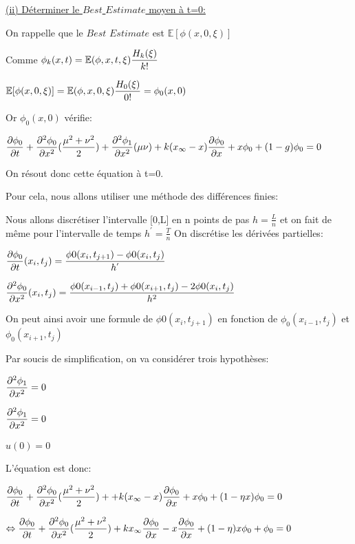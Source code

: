 \documentclass[a4paper,oneside,11pt]{article}
\newcommand{\ds}{\ensuremath{\displaystyle}}
\newcommand{\dr}{\ensuremath{\partial}}
\begin{document}
\underline{(ii) Déterminer le $Best$ $Estimate$ moyen à t=0:}

On rappelle que le $Best$ $Estimate$ est $\mathbb{E}[\phi(x,0,\xi)]$

Comme $\ds{\phi_{k}(x,t)=\mathbb{E}(\phi,x,t,\xi)\frac{H_{k}(\xi)}{k!}}$

$\ds{\mathbb{E}[\phi(x,0,\xi)]=\mathbb{E}(\phi,x,0,\xi)\frac{H_{0}(\xi)}{0!}=\phi_{0}(x,0)}$

Or $\phi_{0}(x,0)$ vérifie:

$\ds{\frac{\dr \phi_{0}}{\dr t} +\frac{\dr^{2}\phi_{0}}{\dr x^{2}}(\frac{\mu^{2}+\nu^{2}}{2})+\frac{\dr^{2}\phi_{1}}{\dr x^{2}}(\mu\nu)+k(x_{\infty}-x)\frac{\dr \phi_{0}}{\dr x} +x\phi_{0}+(1-g)\phi_{0}=0}$

On résout donc cette équation à t=0.

Pour cela, nous allons utiliser une méthode des différences finies:

Nous allons discrétiser l'intervalle [0,L] en n points de pas $h=\frac{L}{n}$ et on fait de même pour l'intervalle de temps $h^{'}=\frac{T}{n}$
On discrétise les dérivées partielles:

$\ds{\frac{\dr \phi_{0}}{\dr t}(x_{i},t_{j})=\frac{\phi{0}(x_{i},t_{j+1})-\phi{0}(x_{i},t_{j})}{h^{'}}}$

$\ds{\frac{\dr^{2} \phi_{0}}{\dr x^{2}}(x_{i},t_{j})=\frac{\phi{0}(x_{i-1},t_{j})+\phi{0}(x_{i+1},t_{j})-2\phi{0}(x_{i},t_{j})}{h^{2}}}$

On peut ainsi avoir une formule de $\phi{0}(x_{i},t_{j+1})$ en fonction de $\phi_{0}(x_{i-1},t_{j})$ et $\phi_{0}(x_{i+1},t_{j})$

Par soucis de simplification, on va considérer trois hypothèses:

$\ds{\frac{\partial^{2}\phi_{1}}{\partial x^{2}}=0}$

$\ds{\frac{\partial^{2}\phi_{1}}{\partial x^{2}}=0}$

$u(0)=0$

L'équation est donc:

$\ds{\frac{\partial\phi_{0}}{\partial t} +\frac{\partial^{2}\phi_{0}}{\partial x^{2}}(\frac{\mu^{2}+\nu^{2}}{2})++k(x_{\infty}-x)\frac{\partial \phi_{0}}{\partial x} +x\phi_{0}+(1-\eta x)\phi_{0}=0}$

$\Leftrightarrow \ds{\frac{\partial\phi_{0}}{\partial t} +\frac{\partial^{2}\phi_{0}}{\partial x^{2}}(\frac{\mu^{2}+\nu^{2}}{2})+kx_{\infty}\frac{\partial \phi_{0}}{\partial x}-x\frac{\partial \phi_{0}}{\partial x} +(1-\eta)x\phi_{0}+\phi_{0}=0}$
\end{document}
